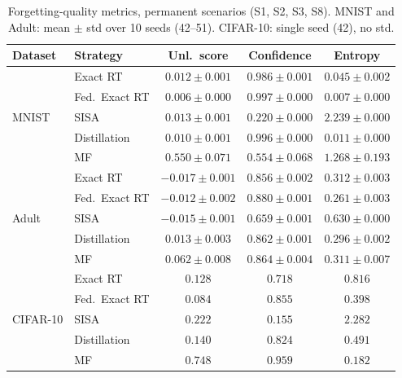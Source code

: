 \begin{table}[H]
\centering
\caption{Forgetting-quality metrics, permanent scenarios (S1, S2, S3, S8). MNIST and Adult: mean $\pm$ std over 10 seeds (42--51). CIFAR-10: single seed (42), no std.}
\label{tab:forgetting}
\small
\renewcommand{\arraystretch}{1.2}
\begin{tabular}{@{} l l c c c @{}}
\toprule
\textbf{Dataset} & \textbf{Strategy} & \textbf{Unl.\ score} & \textbf{Confidence} & \textbf{Entropy} \\
\midrule
\multirow{5}{*}{MNIST} & Exact RT & $0.012 \pm 0.001$ & $0.986 \pm 0.001$ & $0.045 \pm 0.002$ \\
 & Fed.\ Exact RT & $0.006 \pm 0.000$ & $0.997 \pm 0.000$ & $0.007 \pm 0.000$ \\
 & SISA & $0.013 \pm 0.001$ & $0.220 \pm 0.000$ & $2.239 \pm 0.000$ \\
 & Distillation & $0.010 \pm 0.001$ & $0.996 \pm 0.000$ & $0.011 \pm 0.000$ \\
 & MF & $0.550 \pm 0.071$ & $0.554 \pm 0.068$ & $1.268 \pm 0.193$ \\
\midrule
\multirow{5}{*}{Adult} & Exact RT & $-0.017 \pm 0.001$ & $0.856 \pm 0.002$ & $0.312 \pm 0.003$ \\
 & Fed.\ Exact RT & $-0.012 \pm 0.002$ & $0.880 \pm 0.001$ & $0.261 \pm 0.003$ \\
 & SISA & $-0.015 \pm 0.001$ & $0.659 \pm 0.001$ & $0.630 \pm 0.000$ \\
 & Distillation & $0.013 \pm 0.003$ & $0.862 \pm 0.001$ & $0.296 \pm 0.002$ \\
 & MF & $0.062 \pm 0.008$ & $0.864 \pm 0.004$ & $0.311 \pm 0.007$ \\
\midrule
\multirow{5}{*}{CIFAR-10} & Exact RT & $0.128$ & $0.718$ & $0.816$ \\
 & Fed.\ Exact RT & $0.084$ & $0.855$ & $0.398$ \\
 & SISA & $0.222$ & $0.155$ & $2.282$ \\
 & Distillation & $0.140$ & $0.824$ & $0.491$ \\
 & MF & $0.748$ & $0.959$ & $0.182$ \\
\bottomrule
\end{tabular}
\end{table}
